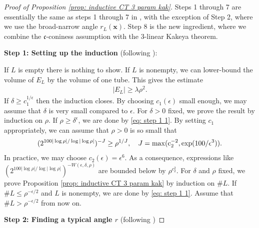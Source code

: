 \documentclass[12pt]{amsart}
\newcommand{\x}{{\bf{x}}}
\numberwithin{equation}{section}
\newcommand{\1}{\mathbbm{1}}
\renewcommand{\x}{\mathbf x}
\renewcommand{\max}{\rm{max}}
\begin{document}
\begin{proof}[Proof of Proposition \ref{prop: inductive CT 3 param kak}] 
    Steps 1 through 7 are essentially the same as steps 1 through 7 in \cite[Proposition 4.2]{KWZ}, with the exception of Step 2, where we use the broad-narrow angle $r_L(\x)$. Step 8 is the new ingredient, where we combine the $\mathfrak c$-coniness assumption with the 3-linear Kakeya theorem.

    \medskip

    \noindent \textbf{Step 1: Setting up the induction} (following \cite[Step 1 pg. 16]{KWZ}):

    

    If $L$ is empty there is nothing to show. If $L$ is nonempty, we can lower-bound the volume of $E_L$ by the volume of one tube. This gives the estimate
    \begin{align}\label{eq: step 1 1}
        |E_L| \geq \lambda \rho^2. 
    \end{align}
    If $\delta \geq c_1^{1/\epsilon}$ then the induction closes. By choosing $c_1(\epsilon)$ small enough, we may assume that $\delta$ is very small compared to $\epsilon$. For $\delta > 0$ fixed, we prove the result by induction on $\rho$. If $\rho \geq \delta^\epsilon$, we are done by \eqref{eq: step 1 1}. By setting $c_1$ appropriately, we can assume that $\rho > 0$ is so small that 
    \begin{align}
        (2^{100|\log \rho| / \log |\log \rho|})^{-J} \geq \rho^{1/J}, \quad J = \max(c_2^{-2}, \exp(100/\epsilon^3)). 
    \end{align}
    In practice, we may choose $c_2(\epsilon) = \epsilon^6$. As a consequence, expressions like $(2^{100 |\log \rho| /\log |\log \rho|})^{-W(\epsilon, \delta, \rho)}$ are bounded below by $\rho^{c_2^2}$.
    For $\delta$ and $\rho$ fixed, we prove Proposition \ref{prop: inductive CT 3 param kak} by induction on $\# L$. If $\# L \leq \rho^{-\epsilon /2}$ and $L$ is nonempty, we are done by \eqref{eq: step 1 1}. Assume that $\# L > \rho^{-\epsilon / 2}$ from now on. 

        
    \medskip
    
    \noindent \textbf{Step 2: Finding a typical angle $r$} (following \cite[Step 2 pg. 16]{KWZ})


\end{proof}
\end{document}
